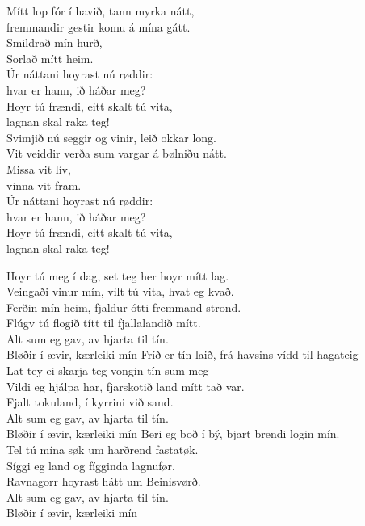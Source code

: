 \clearpage
{}

Mítt lop fór í havið, tann myrka nátt,\\
fremmandir gestir komu á mína gátt.\\
Smildrað mín hurð,\\
Sorlað mítt heim.
\hops
{} {}\\
 Úr náttani hoyrast nú røddir:\\
 hvar er hann, ið háðar meg?\\
 Hoyr tú frændi, eitt skalt tú vita,\\
 lagnan skal raka teg!\\
\hops
Svimjið nú seggir og vinir, leið okkar long.\\
Vit veiddir verða sum vargar á bølniðu nátt.\\
Missa vit lív,\\
vinna vit fram.
\hops
{} {}\\
 Úr náttani hoyrast nú røddir:\\
 hvar er hann, ið háðar meg?\\
 Hoyr tú frændi, eitt skalt tú vita,\\
 lagnan skal raka teg!\\

\clearpage
{}

Hoyr tú meg í dag, set teg her hoyr mítt lag.\\
Veingaði vinur mín, vilt tú vita, hvat eg kvað.\\
Ferðin mín heim, fjaldur ótti fremmand strond.\\
Flúgv tú flogið títt til fjallalandið mítt.
\hops
{} {}\\
 Alt sum eg gav, av hjarta til tín.\\
 Bløðir í ævir, kærleiki mín
\hops
Fríð er tín laið, frá havsins vídd til hagateig\\
Lat tey ei skarja teg vongin tín sum meg\\
Vildi eg hjálpa har, fjarskotið land mítt tað var.\\
Fjalt tokuland, í kyrrini við sand.
\hops
{} {}\\
 Alt sum eg gav, av hjarta til tín.\\
 Bløðir í ævir, kærleiki mín
\hops
Beri eg boð í bý, bjart brendi login mín.\\
Tel tú mína søk um harðrend fastatøk.\\
Síggi eg land og fígginda lagnufør.\\
Ravnagorr hoyrast hátt um Beinisvørð.
\hops
{} {}\\
 Alt sum eg gav, av hjarta til tín.\\
 Bløðir í ævir, kærleiki mín

